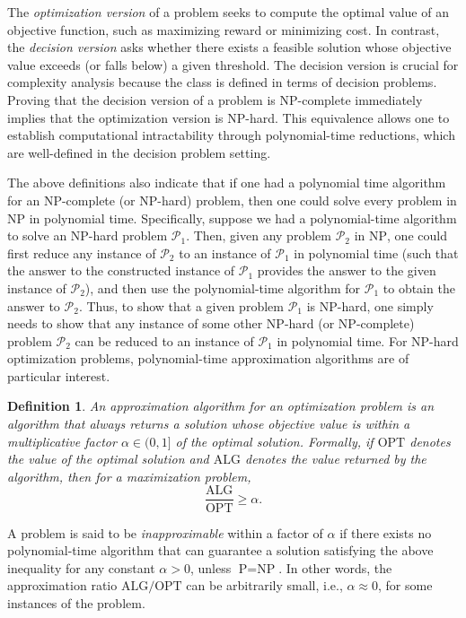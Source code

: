 \documentclass[twocolumn]{autart}    %
\newtheorem{definition}{Definition}
\begin{document}
The \textit{optimization version} of a problem seeks to compute the optimal value of an objective function, such as maximizing reward or minimizing cost. In contrast, the \textit{decision version} asks whether there exists a feasible solution whose objective value exceeds (or falls below) a given threshold. The decision version is crucial for complexity analysis because the class  is defined in terms of decision problems. Proving that the decision version of a problem is NP-complete immediately implies that the optimization version is NP-hard. This equivalence allows one to establish computational intractability through polynomial-time reductions, which are well-defined in the decision problem setting.


The above definitions also indicate that if one had a polynomial time algorithm for an NP-complete (or NP-hard) problem, then one could solve every problem in NP in polynomial time. Specifically, suppose we had a polynomial-time algorithm to solve an NP-hard problem $\mathcal{P}_1$. Then, given any problem $\mathcal{P}_2$ in $\mathrm{NP}$, one could first reduce any instance of $\mathcal{P}_2$ to an instance of $\mathcal{P}_1$ in polynomial time (such that the answer to the constructed instance of $\mathcal{P}_1$ provides the answer to the given instance of $\mathcal{P}_2$), and then use the polynomial-time algorithm for $\mathcal{P}_1$ to obtain the answer to $\mathcal{P}_2$. Thus, to show that a given problem $\mathcal{P}_1$ is NP-hard, one simply needs to show that any instance of some other NP-hard (or NP-complete) problem $\mathcal{P}_2$ can be reduced to an instance of $\mathcal{P}_1$ in polynomial time. For NP-hard optimization problems, polynomial-time approximation algorithms are of particular interest.\\

\begin{definition}
An \textit{approximation algorithm} for an optimization problem is an algorithm that always returns a solution whose objective value is within a multiplicative factor $\alpha \in (0,1]$ of the optimal solution. Formally, if $\text{OPT}$ denotes the value of the optimal solution and $\text{ALG}$ denotes the value returned by the algorithm, then for a maximization problem,
\[
\frac{\text{ALG}}{\text{OPT}} \geq \alpha.
\]
\end{definition}

A problem is said to be \textit{inapproximable} within a factor of $\alpha$ if there exists no polynomial-time algorithm that can guarantee a solution satisfying the above inequality for any constant $\alpha > 0$, unless $\text{P} = \text{NP}$. In other words, the approximation ratio $\text{ALG}/\text{OPT}$ can be arbitrarily small, i.e., $\alpha \approx 0$, for some instances of the problem.
\end{document}
